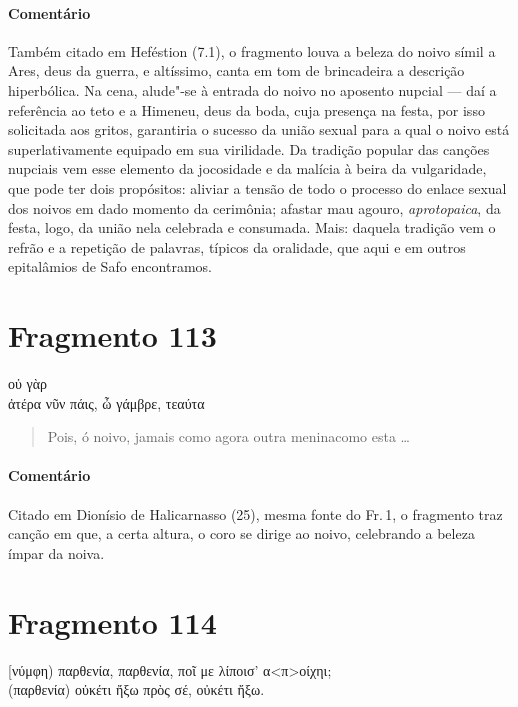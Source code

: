 \paragraph{Comentário} Também citado em Heféstion (7.1), o fragmento louva a beleza do noivo símil a Ares,
deus da guerra, e altíssimo, canta em tom de brincadeira a descrição
hiperbólica. Na cena, alude"-se à entrada do noivo no aposento nupcial --- daí a
referência ao teto e a Himeneu, deus da boda, cuja presença na festa, por isso
solicitada aos gritos, garantiria o sucesso da união sexual para a qual o noivo está superlativamente equipado em sua virilidade. Da tradição popular das canções nupciais vem esse elemento da jocosidade e da malícia à beira da vulgaridade, que pode ter dois propósitos: aliviar a tensão de todo o processo do enlace sexual dos noivos em dado momento da cerimônia; afastar mau agouro, \emph{aprotopaica}, da festa, logo, da união nela celebrada e consumada. Mais: daquela tradição vem o refrão e a repetição de palavras, típicos da oralidade, que aqui e em outros epitalâmios de Safo encontramos.


\section{Fragmento 113}

\begin{gkverse}
  οὐ γὰρ\\
ἀτέρα νῦν πάις, ὦ γάμβρε, τεαύτα
\end{gkverse}

\begin{verse}
Pois, ó noivo, jamais como agora outra menina\qb{}como esta \ldots{}
\end{verse}

\medskip

{\paragraph{Comentário} Citado em Dionísio de Halicarnasso (25), mesma fonte do Fr.\,1, o fragmento traz canção em que, a certa altura, o coro se dirige ao noivo, celebrando a beleza ímpar da noiva.}



\section{Fragmento 114}

\begin{gkverse}
[νύμφη) παρθενία, παρθενία, ποῖ με λίποισ’ α<π>οίχηι;\\
(παρθενία)  \dagger{}οὐκέτι ἤξω πρὸς σέ, οὐκέτι ἤξω\dagger{}.
\end{gkverse}

